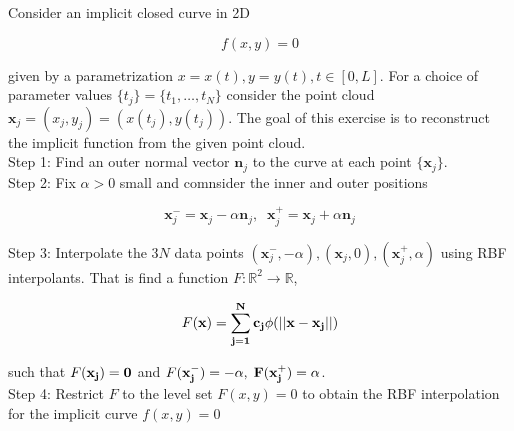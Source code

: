 Consider an implicit closed curve in 2D

$$f(x,y)=0$$

given by a parametrization $x=x(t), y=y(t), t\in[0,L]$. For a choice of parameter values
$\{t_j\}=\{t_1,\ldots,t_N\}$ consider the point cloud $\textbf{x}_j=(x_j,y_j)=(x(t_j),y(t_j))$. The goal
of this exercise is to reconstruct the implicit function from the given point cloud.\\

Step 1: Find an outer normal vector $\textbf{n}_j$ to the curve at each point $\{\textbf{x}_j\}$.\\

Step 2: Fix $\alpha>0$ small and comnsider the inner and outer positions

$$\textbf{x}_j^-=\textbf{x}_j-\alpha\textbf{n}_j,\;\;\textbf{x}_j^+=\textbf{x}_j+\alpha\textbf{n}_j$$

Step 3: Interpolate the $3N$ data points
$(\textbf{x}_j^-,-\alpha),(\textbf{x}_j,0),(\textbf{x}_j^+,\alpha)$ using RBF interpolants. That is find
a function $F:\mathbb{R}^2\to\mathbb{R}$,

$$F(\bf{x})=\sum_{j=1}^Nc_j\phi(||x-x_j||)$$

such that $F(\bf{x}_j)=0$ and $F(\bf{x}_j^-)=-\alpha,\;F(\bf{x}_j^+)=\alpha$.\\

Step 4: Restrict $F$ to the level set $F(x,y)=0$ to obtain the RBF interpolation for the implicit curve
$f(x,y)=0$